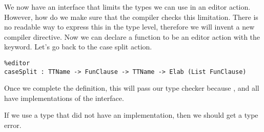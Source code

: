 We now have an interface that limits the types we can use in an editor action.
However, how do we make sure that the compiler checks this limitation.
There is no readable way to express this in the type level, therefore we will
invent a new compiler directive. Now we can declare a function to be an editor
action with the \texttt{} keyword. Let's go back to the
case split action.

\begin{Verbatim}
%editor
caseSplit : TTName -> FunClause -> TTName -> Elab (List FunClause)
\end{Verbatim}

Once we complete the definition, this will pass our type checker because
,  and  all have implementations of
the  interface.

If we use a type that did not have an  implementation, then
we should get a type error.
